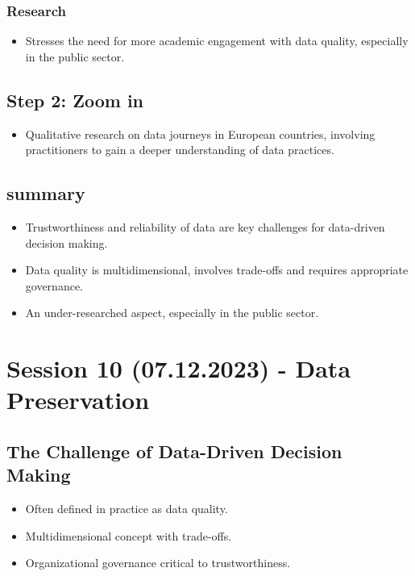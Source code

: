 \documentclass{article}
\begin{document}
\subsubsection*{Research}
\begin{itemize}
    \item Stresses the need for more academic engagement with data quality, especially in the public sector.
\end{itemize}

\subsection*{Step 2: Zoom in}
\begin{itemize}
    \item Qualitative research on data journeys in European countries, involving practitioners to gain a deeper understanding of data practices.
\end{itemize}

\subsection*{summary}
\begin{itemize}
    \item Trustworthiness and reliability of data are key challenges for data-driven decision making.
    \item Data quality is multidimensional, involves trade-offs and requires appropriate governance.
    \item An under-researched aspect, especially in the public sector.
\end{itemize}

\section*{Session 10 (07.12.2023) - Data Preservation}

\subsection*{The Challenge of Data-Driven Decision Making}
\begin{itemize}
  \item Often defined in practice as data quality.
  \item Multidimensional concept with trade-offs.
  \item Organizational governance critical to trustworthiness.
\end{itemize}
\end{document}
